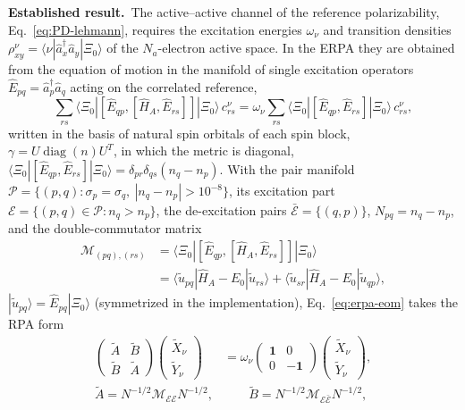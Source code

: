 \documentclass[aip,jcp,reprint,noshowkeys,superscriptaddress]{revtex4-1}
\newcommand{\Established}{\textbf{Established result.}\ }
\begin{document}
\Established The active--active channel of the reference polarizability,
Eq.~\eqref{eq:PD-lehmann}, requires the excitation energies $\omega_\nu$
and transition densities
$\rho^{\nu}_{xy}=\langle\nu|\hat a_x^\dagger\hat a_y|\Xi_0\rangle$ of the
$N_a$-electron active space.  In the ERPA they are obtained from the
equation of motion in the manifold of single excitation operators
$\hat E_{pq}=\hat a_p^\dagger\hat a_q$ acting on the correlated reference,
\begin{equation}
  \sum_{rs}\langle\Xi_0|[\hat E_{qp},[\hat H_A,\hat E_{rs}]]|\Xi_0\rangle\,c^{\nu}_{rs}
  =\omega_\nu\sum_{rs}\langle\Xi_0|[\hat E_{qp},\hat E_{rs}]|\Xi_0\rangle\,c^{\nu}_{rs},
  \label{eq:erpa-eom}
\end{equation}
written in the basis of natural spin orbitals of each spin block,
$\gamma=U\operatorname{diag}(n)U^{T}$, in which the metric is diagonal,
$\langle\Xi_0|[\hat E_{qp},\hat E_{rs}]|\Xi_0\rangle=\delta_{pr}\delta_{qs}(n_q-n_p)$.
With the pair manifold
$\mathcal P=\{(p,q):\sigma_p=\sigma_q,\ |n_q-n_p|>10^{-8}\}$, its
excitation part $\mathcal E=\{(p,q)\in\mathcal P:n_q>n_p\}$, the
de-excitation pairs $\bar{\mathcal E}=\{(q,p)\}$, $N_{pq}=n_q-n_p$, and the
double-commutator matrix
\begin{align}
  \mathcal M_{(pq),(rs)}&=\langle\Xi_0|[\hat E_{qp},[\hat H_A,\hat E_{rs}]]|\Xi_0\rangle
  \nonumber\\
  &=\langle\tilde u_{pq}|\hat H_A-E_0|\tilde u_{rs}\rangle
  +\langle\tilde u_{sr}|\hat H_A-E_0|\tilde u_{qp}\rangle ,
  \label{eq:erpa-M}
\end{align}
$|\tilde u_{pq}\rangle=\hat E_{pq}|\Xi_0\rangle$ (symmetrized in the
implementation), Eq.~\eqref{eq:erpa-eom} takes the RPA form
\begin{align}
  \begin{pmatrix}\tilde A&\tilde B\\ \tilde B&\tilde A\end{pmatrix}
  \begin{pmatrix}\tilde X_\nu\\ \tilde Y_\nu\end{pmatrix}
  &=\omega_\nu\begin{pmatrix}\mathbf 1&0\\0&-\mathbf 1\end{pmatrix}
  \begin{pmatrix}\tilde X_\nu\\ \tilde Y_\nu\end{pmatrix},
  \label{eq:erpa-rpa}\\
  \tilde A=N^{-1/2}\mathcal M_{\mathcal E\mathcal E}N^{-1/2},&\qquad
  \tilde B=N^{-1/2}\mathcal M_{\mathcal E\bar{\mathcal E}}N^{-1/2},
  \nonumber
\end{align}
\end{document}
